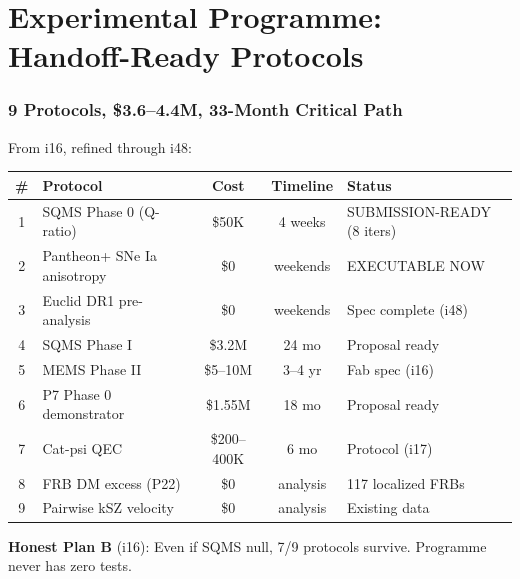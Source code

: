 \documentclass[11pt,a4paper]{article}
\begin{document}
\part{Experimental Programme: Handoff-Ready Protocols}
\label{part:experimental}

\section{9 Protocols, \$3.6--4.4M, 33-Month Critical Path}

From i16, refined through i48:

\begin{center}
\begin{longtable}{clccl}
\toprule
\textbf{\#} & \textbf{Protocol} & \textbf{Cost} & \textbf{Timeline} & \textbf{Status} \\
\midrule
\endfirsthead
1 & SQMS Phase 0 (Q-ratio) & \$50K & 4 weeks & SUBMISSION-READY (8 iters) \\
2 & Pantheon+ SNe Ia anisotropy & \$0 & weekends & EXECUTABLE NOW \\
3 & Euclid DR1 pre-analysis & \$0 & weekends & Spec complete (i48) \\
4 & SQMS Phase I & \$3.2M & 24 mo & Proposal ready \\
5 & MEMS Phase II & \$5--10M & 3--4 yr & Fab spec (i16) \\
6 & P7 Phase 0 demonstrator & \$1.55M & 18 mo & Proposal ready \\
7 & Cat-psi QEC & \$200--400K & 6 mo & Protocol (i17) \\
8 & FRB DM excess (P22) & \$0 & analysis & 117 localized FRBs \\
9 & Pairwise kSZ velocity & \$0 & analysis & Existing data \\
\bottomrule
\end{longtable}
\end{center}

\textbf{Honest Plan B} (i16): Even if SQMS null, 7/9 protocols survive. Programme never has zero tests.
\end{document}
